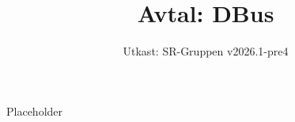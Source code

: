 \documentclass[a4paper]{dtek}
\title{Avtal: DBus}
\date{Utkast: SR-Gruppen v2026.1-pre4}
\begin{document}
Placeholder
\end{document}
